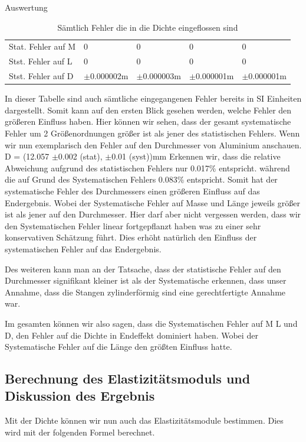 \documentclass[twoside]{protokoll}
\begin{document}
\begin{aufgabe}{Auswertung}
\begin{table}[H]
\begin{tabularx}{1\textwidth}{l X X X X}
            \midrule
            Stat. Fehler auf M & 0 & 0 & 0 & 0 \\
            Stst. Fehler auf L & 0 & 0 & 0 & 0 \\
            Stst. Fehler auf D & $\pm$0.000002m & $\pm$0.000003m & $\pm$0.000001m & $\pm$0.000001m \\
           
            \bottomrule
        \end{tabularx}
        \caption{Sämtlich Fehler die in die Dichte eingeflossen sind}
        \label{tab:mytable}
    \end{table}

In dieser Tabelle sind auch sämtliche eingegangenen Fehler bereits in SI Einheiten dargestellt. Somit kann auf den ersten Blick gesehen werden, welche Fehler den größeren 
Einfluss haben. Hier können wir sehen, dass der gesamt systematische Fehler um 2 Größenordnungen größer ist als jener des statistischen Fehlers. Wenn wir nun exemplarisch den Fehler auf den Durchmesser von Aluminium anschauen.
 D = (12.057 $\pm$0.002 (stat), $\pm$0.01 (syst))mm 
Erkennen wir, dass die relative Abweichung aufgrund des statistischen 
Fehlers nur 0.017\% entspricht. während die auf Grund des Systematischen Fehlers
0.083\% entspricht. Somit hat der systematische Fehler des Durchmessers
einen größeren Einfluss auf das Endergebnis. Wobei der Systematische Fehler auf Masse und Länge jeweils größer ist als jener auf den Durchmesser. 
Hier darf aber nicht vergessen werden, dass wir den Systematischen Fehler linear fortgepflanzt haben was zu einer sehr konservativen Schätzung führt. Dies erhöht 
natürlich den Einfluss der systematischen Fehler auf das Endergebnis. 

Des weiteren kann man an der Tatsache, dass der statistische Fehler auf den Durchmesser 
signifikant kleiner ist als der Systematische erkennen, dass unser Annahme, 
dass die Stangen zylinderförmig sind eine gerechtfertigte Annahme war. 

Im gesamten können wir also sagen, dass die Systematischen Fehler auf M L und D, den
Fehler auf die Dichte in Endeffekt dominiert haben. Wobei der Systematische Fehler auf
die Länge den größten Einfluss hatte.  

\subsection{Berechnung des Elastizitätsmoduls und Diskussion des Ergebnis}
Mit der Dichte können wir nun auch das Elastizitätsmodule bestimmen. Dies wird mit der folgenden Formel berechnet. 


\end{aufgabe}
\end{document}
